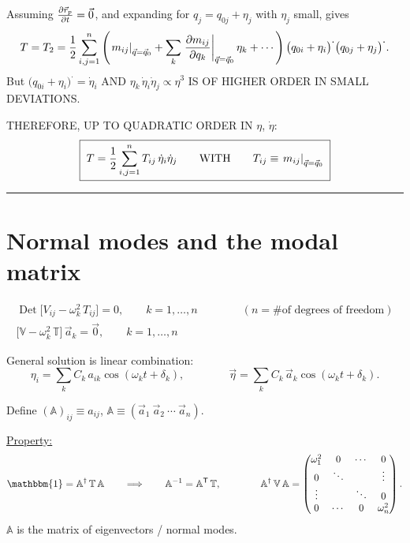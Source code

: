 \documentclass[11pt]{article}
\newcommand{\Vm}{\mathbb{V}}
\newcommand{\Tm}{\mathbb{T}}
\newcommand{\Am}{\mathbb{A}}
\newcommand{\Idm}{\mathbbm{1}}
\begin{document}
\medskip

Assuming $\frac{\partial \vec r_p}{\partial t} = \vec 0$, and expanding for $q_j = q_{0j} + \eta_j$ with
$\eta_j$ small, gives
\begin{equation*}
  T = T_2 = \frac{1}{2}\sum_{i,j=1}^{n}
    \left( \left.m_{ij}\right|_{\vec q = \vec q_0}
         + \sum_k \left.\frac{\partial m_{ij}}{\partial q_k}\right|_{\vec q = \vec q_0}\eta_k + \cdots \right)
    \bigl(q_{0i}+\eta_i\bigr)^{\bm\cdot}\bigl(q_{0j}+\eta_j\bigr)^{\bm\cdot} .
\end{equation*}
But $\bigl(q_{0i}+\eta_i\bigr)^{\bm\cdot} = \dot\eta_i$ AND
$\eta_k\,\dot\eta_i\dot\eta_j \propto \eta^3$ IS OF HIGHER ORDER IN SMALL DEVIATIONS.

THEREFORE, UP TO QUADRATIC ORDER IN $\eta$, $\dot\eta$:
\begin{equation*}
  \boxed{\;
    T = \frac{1}{2}\sum_{i,j=1}^{n} T_{ij}\,\dot\eta_i\dot\eta_j
    \qquad\text{WITH}\qquad
    T_{ij} \equiv \left.m_{ij}\right|_{\vec q = \vec q_0} \;}
\end{equation*}

\hrule\vspace{6pt}

\section*{Normal modes and the modal matrix}

\begin{gather*}
  \operatorname{Det}\bigl[V_{ij} - \omega_k^2\,T_{ij}\bigr] = 0 ,
  \qquad k = 1,\dots,n
  \qquad\qquad (n = \text{\# of degrees of freedom})\\[2pt]
  \bigl[\Vm - \omega_k^2\,\Tm\bigr]\,\vec a_k = \vec 0 ,
  \qquad k = 1,\dots,n
\end{gather*}

General solution is linear combination:
\begin{equation*}
  \eta_i = \sum_k C_k\, a_{ik}\cos(\omega_k t + \delta_k) ,
  \qquad\qquad
  \vec\eta = \sum_k C_k\, \vec a_k \cos(\omega_k t + \delta_k) .
\end{equation*}

Define $(\Am)_{ij} \equiv a_{ij}$, \quad $\Am \equiv (\vec a_1\ \vec a_2\ \cdots\ \vec a_n)$.

\medskip
\underline{Property:}
\begin{equation*}
  \Idm = \Am^{\dagger}\,\Tm\,\Am
  \qquad\Longrightarrow\qquad
  \Am^{-1} = \Am^{\mathsf T}\,\Tm ,
  \qquad\qquad
  \Am^{\dagger}\,\Vm\,\Am =
  \begin{pmatrix}
    \omega_1^2 & 0 & \cdots & 0\\
    0 & \ddots & & \vdots\\
    \vdots & & \ddots & 0\\
    0 & \cdots & 0 & \omega_n^2
  \end{pmatrix}.
\end{equation*}
$\Am$ is the matrix of eigenvectors / normal modes.
\end{document}
